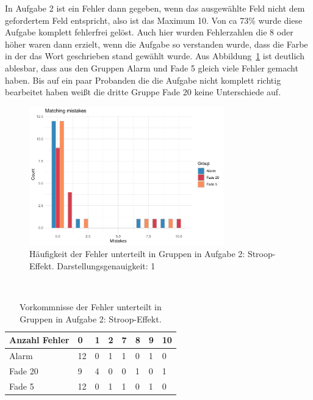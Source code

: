 
In Aufgabe 2 ist ein Fehler dann gegeben, wenn das ausgewählte Feld nicht dem gefordertem Feld entspricht, also ist das Maximum 10.
Von ca 73\% wurde diese Aufgabe komplett fehlerfrei gelöst.
Auch hier wurden Fehlerzahlen die 8 oder höher waren dann erzielt, wenn die Aufgabe so verstanden wurde, dass die Farbe in der das Wort geschrieben stand gewählt wurde.
Aus Abbildung~\ref{fig:matchingMistakeHistogram} ist deutlich ablesbar, dass aus den Gruppen Alarm und Fade 5 gleich viele Fehler gemacht haben. Bis auf ein paar Probanden die die Aufgabe nicht komplett richtig bearbeitet haben weißt die dritte Gruppe Fade 20 keine Unterschiede auf.


\begin{figure}[H]
	\centering
	\includegraphics[width=0.75\textwidth]{./_StudyResults/matchingMisHist}
	\caption{Häufigkeit der Fehler unterteilt in Gruppen in Aufgabe 2: Stroop-Effekt. Darstellungsgenauigkeit: 1}
	\label{fig:matchingMistakeHistogram}
\end{figure}

\begin{table}
	\caption{Vorkommnisse der Fehler unterteilt in Gruppen in Aufgabe 2: Stroop-Effekt.}~\label{tab:matchingMistakeNumbers}
	
	\setlength\tabcolsep{3pt}
	\renewcommand{\arraystretch}{1.4}%
	\begin{tabularx}{\textwidth}{ | l | x | x | x | x | x | x | x | }
		\hline
		Anzahl Fehler & 0   & 1  & 2  & 7  & 8  & 9 & 10 \\ \hline\hline
		Alarm 	  & 12  & 0  & 1  & 1  & 0  & 1 & 0  \\ \hline
		Fade 20   & 9  & 4  & 0  & 0  & 1  & 0 & 1  \\ \hline
		Fade 5 	  & 12  & 0  & 1  & 1  & 0  & 1 & 0  \\ \hline
	\end{tabularx}
\end{table}

